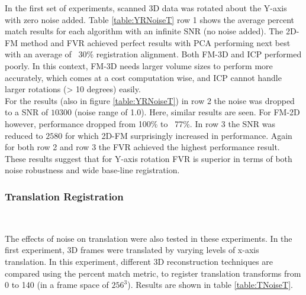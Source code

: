In the first set of experiments, scanned 3D data was rotated about the Y-axis with zero noise added. Table \ref{table:YRNoiseT} row 1 shows the average percent match results for each algorithm with an infinite SNR (no noise added). The 2D-FM method and FVR achieved perfect results with PCA performing next best with an average of ~30\% registration alignment. Both FM-3D and ICP performed poorly. In this context, FM-3D needs larger volume sizes to perform more accurately, which comes at a cost computation wise, and ICP cannot handle larger rotations (> 10 degrees) easily. \\

For the results (also in figure \ref{table:YRNoiseT}) in row 2 the noise was dropped to a SNR of $10300$ (noise range of 1.0). Here, similar results are seen. For FM-2D however, performance dropped from 100\% to ~77\%. In row 3 the SNR was reduced to $2580$ for which 2D-FM surprisingly increased in performance. Again for both row 2 and row 3 the FVR achieved the highest performance result. These results suggest that for Y-axis rotation FVR is superior in terms of both noise robustness and wide base-line registration.  \\

\subsubsection{Translation Registration}

\begin{table}[!htb]
\centering
{}
\\
\caption{Average percent matched registration results for data translated 0 to 140 voxels under varying noise conditions.}
\label{table:TNoiseT}
\end{table}


The effects of noise on translation were also tested in these experiments. In the first experiment, 3D frames were translated by varying levels of x-axis translation. In this experiment, different 3D reconstruction techniques are compared using the percent match metric, to register translation transforms from 0 to 140 (in a frame space of $256^3$). Results are shown in table \ref{table:TNoiseT}. \\

